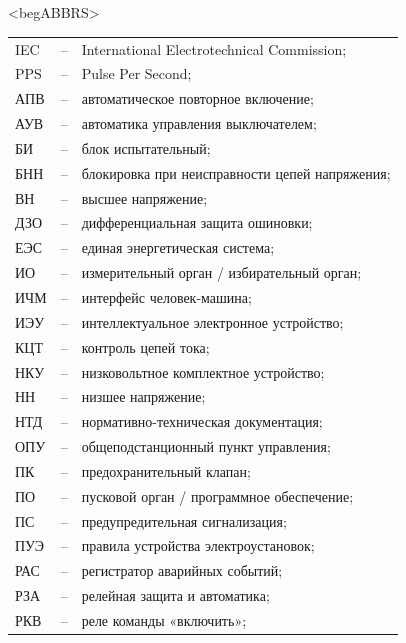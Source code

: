 \color{unimain}\section*{}
{\color{white}\fontsize{0.1pt}{0.1pt}\selectfont<begABBRS>}
\color{black}
\begin{longtable}{>{\raggedright\arraybackslash}m{2cm}>{\raggedright\arraybackslash}m{0.5cm}>{\raggedright\arraybackslash}m{20cm}}
\endfirsthead\endhead\endfoot\endlastfoot
IEC & -- &  International Electrotechnical Commission; \\
PPS & -- & Pulse Per Second; \\
АПВ & -- & автоматическое повторное включение; \\
АУВ & -- & автоматика управления выключателем; \\
БИ & -- & блок испытательный; \\
БНН & -- & блокировка при неисправности цепей напряжения; \\
ВН & -- & высшее напряжение; \\
ДЗО & -- & дифференциальная защита ошиновки; \\
ЕЭС & -- & единая энергетическая система; \\
ИО & -- & измерительный орган / избирательный орган; \\
ИЧМ & -- & интерфейс человек-машина; \\
ИЭУ & -- & интеллектуальное электронное устройство; \\
КЦТ & -- & контроль цепей тока; \\
НКУ & -- & низковольтное комплектное устройство; \\
НН & -- & низшее напряжение; \\
НТД & -- & нормативно-техническая документация; \\
ОПУ & -- & общеподстанционный пункт управления; \\
ПК & -- & предохранительный клапан; \\
ПО & -- & пусковой орган / программное обеспечение; \\
ПС & -- & предупредительная сигнализация; \\
ПУЭ & -- & правила устройства электроустановок; \\
РАС & -- & регистратор аварийных событий; \\
РЗА & -- & релейная защита и автоматика; \\
РКВ & -- & реле команды «включить»; \\

\end{longtable}
